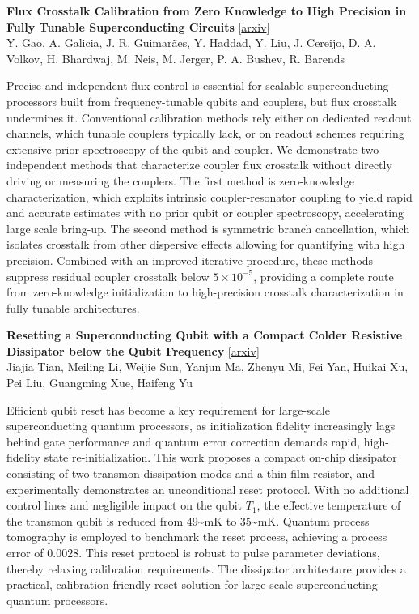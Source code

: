 \documentclass[12pt,letterpaper]{article}
\begin{document}
{\small\textbf{Flux Crosstalk Calibration from Zero Knowledge to High Precision in Fully Tunable Superconducting Circuits}} {\scriptsize[\href{https://arxiv.org/abs/2611.06656}{arxiv}]}\nopagebreak\\
{\scriptsize Y. Gao, A. Galicia, J. R. Guimar\~aes, Y. Haddad, Y. Liu, J. Cereijo, D. A. Volkov, H. Bhardwaj, M. Neis, M. Jerger, P. A. Bushev, R. Barends}\nopagebreak\\[2pt]
{\footnotesize Precise and independent flux control is essential for scalable superconducting processors built from frequency-tunable qubits and couplers, but flux crosstalk undermines it. Conventional calibration methods rely either on dedicated readout channels, which tunable couplers typically lack, or on readout schemes requiring extensive prior spectroscopy of the qubit and coupler. We demonstrate two independent methods that characterize coupler flux crosstalk without directly driving or measuring the couplers. The first method is zero-knowledge characterization, which exploits intrinsic coupler-resonator coupling to yield rapid and accurate estimates with no prior qubit or coupler spectroscopy, accelerating large scale bring-up. The second method is symmetric branch cancellation, which isolates crosstalk from other dispersive effects allowing for quantifying with high precision. Combined with an improved iterative procedure, these methods suppress residual coupler crosstalk below $5\times10^{-5}$, providing a complete route from zero-knowledge initialization to high-precision crosstalk characterization in fully tunable architectures.\par}
\medskip

{\small\textbf{Resetting a Superconducting Qubit with a Compact Colder Resistive Dissipator below the Qubit Frequency}} {\scriptsize[\href{https://arxiv.org/abs/2611.06216}{arxiv}]}\nopagebreak\\
{\scriptsize Jiajia Tian, Meiling Li, Weijie Sun, Yanjun Ma, Zhenyu Mi, Fei Yan, Huikai Xu, Pei Liu, Guangming Xue, Haifeng Yu}\nopagebreak\\[2pt]
{\footnotesize Efficient qubit reset has become a key requirement for large-scale superconducting quantum processors, as initialization fidelity increasingly lags behind gate performance and quantum error correction demands rapid, high-fidelity state re-initialization. This work proposes a compact on-chip dissipator consisting of two transmon dissipation modes and a thin-film resistor, and experimentally demonstrates an unconditional reset protocol. With no additional control lines and negligible impact on the qubit $T_1$, the effective temperature of the transmon qubit is reduced from $49$\textasciitilde{}mK to $35$\textasciitilde{}mK. Quantum process tomography is employed to benchmark the reset process, achieving a process error of $0.0028$. This reset protocol is robust to pulse parameter deviations, thereby relaxing calibration requirements. The dissipator architecture provides a practical, calibration-friendly reset solution for large-scale superconducting quantum processors.\par}
\medskip
\end{document}
